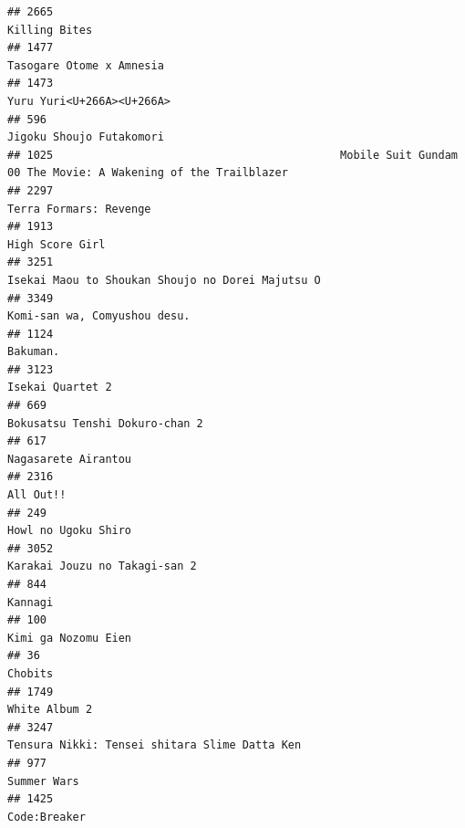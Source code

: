 \documentclass[
]{article}
\begin{document}
\begin{verbatim}
## 2665                                                                                             Killing Bites
## 1477                                                                                  Tasogare Otome x Amnesia
## 1473                                                                                 Yuru Yuri<U+266A><U+266A>
## 596                                                                                   Jigoku Shoujo Futakomori
## 1025                                            Mobile Suit Gundam 00 The Movie: A Wakening of the Trailblazer
## 2297                                                                                    Terra Formars: Revenge
## 1913                                                                                           High Score Girl
## 3251                                                          Isekai Maou to Shoukan Shoujo no Dorei Majutsu O
## 3349                                                                              Komi-san wa, Comyushou desu.
## 1124                                                                                                  Bakuman.
## 3123                                                                                          Isekai Quartet 2
## 669                                                                             Bokusatsu Tenshi Dokuro-chan 2
## 617                                                                                        Nagasarete Airantou
## 2316                                                                                                 All Out!!
## 249                                                                                        Howl no Ugoku Shiro
## 3052                                                                             Karakai Jouzu no Takagi-san 2
## 844                                                                                                    Kannagi
## 100                                                                                        Kimi ga Nozomu Eien
## 36                                                                                                     Chobits
## 1749                                                                                             White Album 2
## 3247                                                             Tensura Nikki: Tensei shitara Slime Datta Ken
## 977                                                                                                Summer Wars
## 1425                                                                                              Code:Breaker

\end{verbatim}
\end{document}
